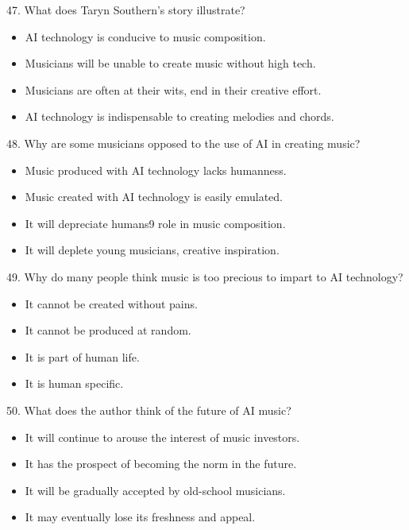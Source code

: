 \documentclass[UTF8,11pt]{ctexart}
\begin{document}
47. What does Taryn Southern's story illustrate?


\begin{itemize}[leftmargin=2em,itemsep=.2em,topsep=.4em]\item[A.] AI technology is conducive to music composition.
\item[B.] Musicians will be unable to create music without high tech.
\item[C.] Musicians are often at their wits, end in their creative effort.
\item[D.] AI technology is indispensable to creating melodies and chords.
\end{itemize}

48. Why are some musicians opposed to the use of AI in creating music?


\begin{itemize}[leftmargin=2em,itemsep=.2em,topsep=.4em]\item[A.] Music produced with AI technology lacks humanness.
\item[B.] Music created with AI technology is easily emulated.
\item[C.] It will depreciate humans9 role in music composition.
\item[D.] It will deplete young musicians, creative inspiration.
\end{itemize}

49. Why do many people think music is too precious to impart to AI technology?


\begin{itemize}[leftmargin=2em,itemsep=.2em,topsep=.4em]\item[A.] It cannot be created without pains.
\item[B.] It cannot be produced at random.
\item[C.] It is part of human life.
\item[D.] It is human specific.
\end{itemize}

50. What does the author think of the future of AI music?


\begin{itemize}[leftmargin=2em,itemsep=.2em,topsep=.4em]\item[A.] It will continue to arouse the interest of music investors.
\item[B.] It has the prospect of becoming the norm in the future.
\item[C.] It will be gradually accepted by old-school musicians.
\item[D.] It may eventually lose its freshness and appeal.
\end{itemize}
\end{document}
